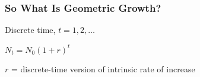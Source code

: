 \documentclass[color=usenames,dvipsnames]{beamer}\usepackage[]{graphicx}\usepackage[]{xcolor}
\begin{document}
\begin{frame}
  \frametitle{So What Is Geometric Growth?}
    \begin{block}{Discrete time, $t=1,2,\ldots$}
     \begin{center}
       \Large
       $N_t = N_0(1+r)^t$
     \end{center}
     $r$ = discrete-time version of intrinsic rate of increase
   \end{block}
\end{frame}
\end{document}
